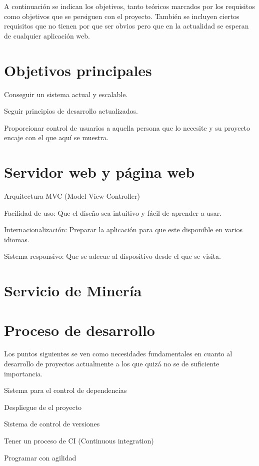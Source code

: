 
A continuación se indican los objetivos, tanto teóricos marcados por los requisitos como objetivos que se persiguen con el proyecto. También se incluyen ciertos requisitos que no tienen por que ser obvios pero que en la actualidad se esperan de cualquier aplicación web.



\section{Objetivos principales} 
\begin{list}{-}{}
\item Conseguir un sistema actual y escalable.
\item Seguir principios de desarrollo actualizados.
\item Proporcionar control de usuarios a aquella persona que lo necesite y su proyecto encaje con el que aquí se muestra.
\end{list}

\section{Servidor web y página web}
\begin{list}{-}{}
\item Arquitectura MVC (Model View Controller)
\item Facilidad de uso: Que el diseño sea intuitivo y fácil de aprender a usar.
\item Internacionalización: Preparar la aplicación para que este disponible en varios idiomas.
\item Sistema responsivo: Que se adecue al dispositivo desde el que se visita.
\end{list}

\section{Servicio de Minería}


\section{Proceso de desarrollo}
Los puntos siguientes se ven como necesidades fundamentales en cuanto al desarrollo de proyectos actualmente a los que quizá no se de suficiente importancia.
\begin{list}{-}{}
\item Sistema para el control de dependencias
\item Despliegue de el proyecto
\item Sistema de control de versiones
\item Tener un proceso de CI (Continuous integration) 
\item Programar con agilidad
\end{list}

